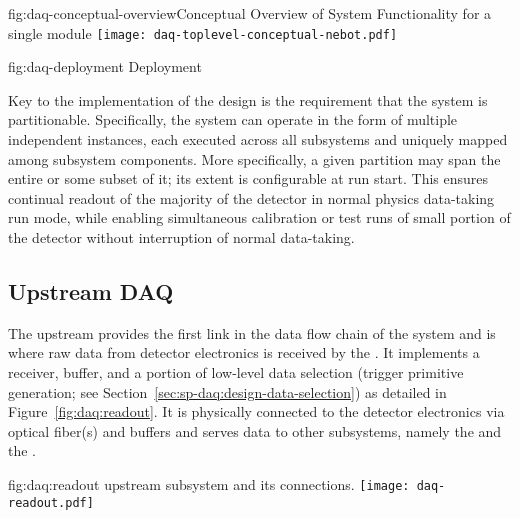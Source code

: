 \begin{dunefigure}{fig:daq-conceptual-overview}{Conceptual
   Overview of  System Functionality for a single \nominalmodsize module}
  \texttt{[image: daq-toplevel-conceptual-nebot.pdf]}
\end{dunefigure}

\begin{dunefigure}{fig:daq-deployment}{ Deployment}
\end{dunefigure}

Key to the implementation of the  design is the requirement that
the system is partitionable. Specifically, the system can operate in
the form of multiple independent  instances, each 
executed across all  subsystems and uniquely mapped among subsystem components. 
More specifically, a given partition may span the entire %
 or some subset of it; its extent is configurable at
run start. This ensures continual readout of the
majority of the detector in normal physics data-taking run mode, while
enabling simultaneous calibration or test runs of small portion of the
detector without interruption of normal data-taking. 

\subsection{Upstream DAQ}
\label{sec:daq:design-upstream}

The upstream  provides the first link in the data flow chain of
the  system and is where raw data from detector electronics
is received by the .
It implements a receiver, buffer, and a portion of low-level data
selection (trigger primitive generation; see Section~\ref{sec:sp-daq:design-data-selection}) as detailed in Figure~\ref{fig:daq:readout}.
It is physically connected to the detector electronics via optical
fiber(s) and buffers and serves data to other  subsystems,
namely the  and the .

\begin{dunefigure}{fig:daq:readout}{ upstream  subsystem and its connections.}
  \texttt{[image: daq-readout.pdf]}
\end{dunefigure}

